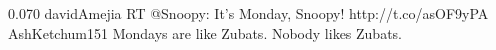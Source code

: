 {0.070}
{\joinNameTweet
{davidAmejia}
{RT @Snoopy: It's Monday, Snoopy! http://t.co/asOF9yPA}}
{\joinNameTweet
{AshKetchum151}
{Mondays are like Zubats. Nobody likes Zubats.}}
%
%
%

